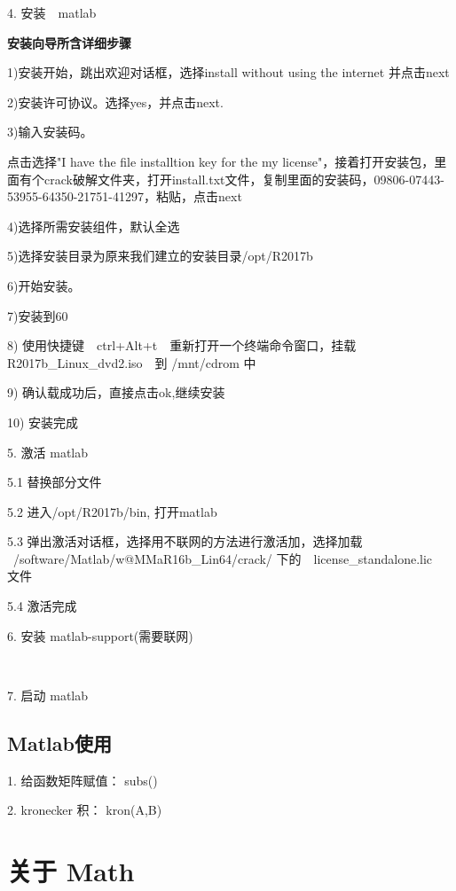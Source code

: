 \documentclass[12pt,a4paper]{article}
\begin{document}
4. 安装　matlab
 


\textbf{安装向导所含详细步骤}

1)安装开始，跳出欢迎对话框，选择install without using the internet 并点击next

2)安装许可协议。选择yes，并点击next.

3)输入安装码。

点击选择"I have the file installtion key for the my license"，接着打开安装包，里面有个crack破解文件夹，打开install.txt文件，复制里面的安装码，09806-07443-53955-64350-21751-41297，粘贴，点击next

4)选择所需安装组件，默认全选

5)选择安装目录为原来我们建立的安装目录/opt/R2017b

6)开始安装。

7)安装到60%

8) 使用快捷键　ctrl+Alt+t　重新打开一个终端命令窗口，挂载 R2017b\_Linux\_dvd2.iso　到 /mnt/cdrom 中
 

9) 确认载成功后，直接点击ok,继续安装

10) 安装完成

5. 激活 matlab

5.1 替换部分文件


5.2 进入/opt/R2017b/bin, 打开matlab
 
 

5.3 弹出激活对话框，选择用不联网的方法进行激活加，选择加载　~/software/Matlab/w@MMaR16b\_Lin64/crack/ 下的　license\_standalone.lic　文件

5.4 激活完成

6. 安装 matlab-support(需要联网)
 

7. 启动 matlab

  
\subsection{Matlab使用}

1. 给函数矩阵赋值： subs()

2. kronecker 积： kron(A,B)

\section{关于 Math}
\end{document}
